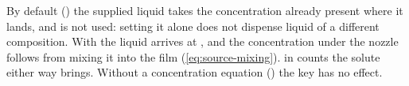 \begin{note}
  By default () the supplied liquid takes the
  concentration already present where it lands, and  is not used:
  setting it alone does not dispense liquid of a different composition. With
   the liquid arrives at , and the
  concentration under the nozzle follows from mixing it into the film
  (\cref{eq:source-mixing}).  in 
  counts the solute either way brings. Without a concentration equation
  () the key has no effect.
\end{note}
